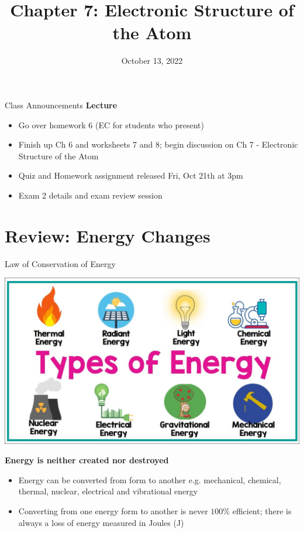 \documentclass[11pt]{beamer}
\title{Chapter 7: Electronic Structure of the Atom}
\institute{Chemistry Department, Cypress College}
\date{October 13, 2022}
\begin{document}
\begin{frame}
  \titlepage
\end{frame}

\begin{frame}{Class Announcements}
  \textbf{Lecture}
  \begin{itemize}
  \item Go over homework 6 (EC for students who present)
  \item Finish up Ch 6 and worksheets 7 and 8; begin discussion on Ch 7
    - Electronic Structure of the Atom
  \item Quiz and Homework assignment released Fri, Oct 21th at 3pm
  \item Exam 2 details and exam review session
  \end{itemize}
\end{frame}

\section{Review: Energy Changes}

\begin{frame}{Law of Conservation of Energy}
  \begin{center}
    \includegraphics[scale=0.13]{energy_types}
    
    \textbf{Energy is neither created nor destroyed}
  \end{center}

  \begin{itemize}
  \item Energy can be converted from form to another
    e.g. mechanical, chemical, thermal, nuclear,
    electrical and vibrational energy
  \item Converting from one energy form to another is
    never $100\%$ efficient; there is always a loss of
    energy measured in Joules (J)
  \end{itemize}
\end{frame}
\end{document}
